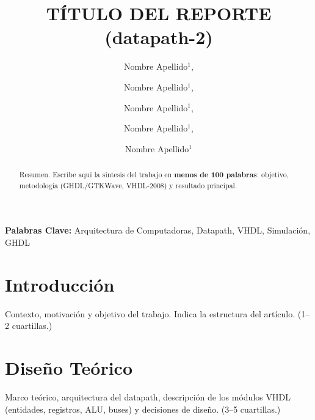 \documentclass[llncs]{llncs}
\begin{document}
\title{TÍTULO DEL REPORTE (datapath-2)}

\author{Nombre Apellido$^{1}$,%
\and Nombre Apellido$^{1}$,%
\and Nombre Apellido$^{1}$,%
\and Nombre Apellido$^{1}$,%
\and Nombre Apellido$^{1}$}


\maketitle

\begin{abstract}
Resumen. Escribe aquí la síntesis del trabajo en \textbf{menos de 100
palabras}: objetivo, metodología (GHDL/GTKWave, VHDL-2008) y resultado
principal.
\end{abstract}

\noindent\textbf{Palabras Clave:} Arquitectura de Computadoras, Datapath,
VHDL, Simulación, GHDL

\section{Introducción}
\label{sec:intro}

Contexto, motivación y objetivo del trabajo. Indica la estructura del
artículo. (1--2 cuartillas.)

\section{Diseño Teórico}
\label{sec:diseno}

Marco teórico, arquitectura del datapath, descripción de los módulos VHDL
(entidades, registros, ALU, buses) y decisiones de diseño. (3--5 cuartillas.)
\end{document}
